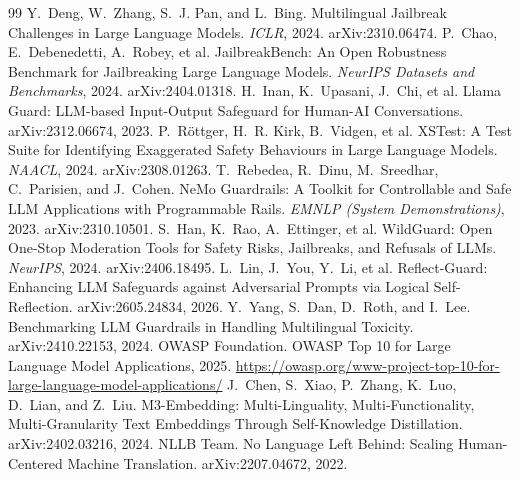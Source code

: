 \documentclass[11pt, a4paper]{article}
\begin{document}
\begin{thebibliography}{99}
 Y.~Deng, W.~Zhang, S.~J. Pan, and L.~Bing. Multilingual Jailbreak Challenges in Large Language Models. \textit{ICLR}, 2024. arXiv:2310.06474.
 P.~Chao, E.~Debenedetti, A.~Robey, et al. JailbreakBench: An Open Robustness Benchmark for Jailbreaking Large Language Models. \textit{NeurIPS Datasets and Benchmarks}, 2024. arXiv:2404.01318.
 H.~Inan, K.~Upasani, J.~Chi, et al. Llama Guard: LLM-based Input-Output Safeguard for Human-AI Conversations. arXiv:2312.06674, 2023.
 P.~R\"ottger, H.~R. Kirk, B.~Vidgen, et al. XSTest: A Test Suite for Identifying Exaggerated Safety Behaviours in Large Language Models. \textit{NAACL}, 2024. arXiv:2308.01263.
 T.~Rebedea, R.~Dinu, M.~Sreedhar, C.~Parisien, and J.~Cohen. NeMo Guardrails: A Toolkit for Controllable and Safe LLM Applications with Programmable Rails. \textit{EMNLP (System Demonstrations)}, 2023. arXiv:2310.10501.
 S.~Han, K.~Rao, A.~Ettinger, et al. WildGuard: Open One-Stop Moderation Tools for Safety Risks, Jailbreaks, and Refusals of LLMs. \textit{NeurIPS}, 2024. arXiv:2406.18495.
 L.~Lin, J.~You, Y.~Li, et al. Reflect-Guard: Enhancing LLM Safeguards against Adversarial Prompts via Logical Self-Reflection. arXiv:2605.24834, 2026.
 Y.~Yang, S.~Dan, D.~Roth, and I.~Lee. Benchmarking LLM Guardrails in Handling Multilingual Toxicity. arXiv:2410.22153, 2024.
 OWASP Foundation. OWASP Top 10 for Large Language Model Applications, 2025. \url{https://owasp.org/www-project-top-10-for-large-language-model-applications/}
 J.~Chen, S.~Xiao, P.~Zhang, K.~Luo, D.~Lian, and Z.~Liu. M3-Embedding: Multi-Linguality, Multi-Functionality, Multi-Granularity Text Embeddings Through Self-Knowledge Distillation. arXiv:2402.03216, 2024.
 NLLB Team. No Language Left Behind: Scaling Human-Centered Machine Translation. arXiv:2207.04672, 2022.
\end{thebibliography}

\appendix
\end{document}
